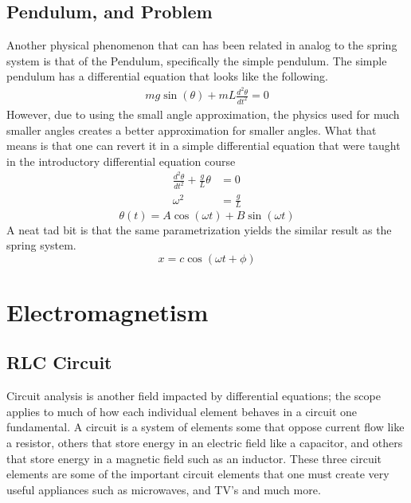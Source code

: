 \documentclass[11pt]{article} %
\begin{document}
\subsection{Pendulum, and Problem}
Another physical phenomenon that can has been related in analog to the spring system is that of the Pendulum, specifically the simple pendulum. The simple pendulum has a differential equation that looks like the following.
\begin{align*}mg\sin(\theta) + mL\frac{d^2\theta}{dt^2}= 0\end{align*} However, due to using the small angle approximation, the physics used for much smaller angles creates a better approximation for smaller angles. What that means is that one can revert it in a simple differential equation that were taught in the introductory differential equation course\begin{align*} \frac{d^2\theta}{dt^2}+\frac{g}{L}\theta&=0 \\ \omega^2 &= \frac{g}{L}\end{align*} \begin{equation} \theta(t)= A\cos(\omega t) + B\sin(\omega t)\end{equation} A neat tad bit is that the same parametrization yields the similar result as the spring system.\begin{equation}x=c\cos(\omega t +\phi) \end{equation}
\newpage
\section{Electromagnetism}
\subsection{RLC Circuit}
Circuit analysis is another field impacted by differential equations; the scope applies to much of how each individual element behaves in a circuit one fundamental. A circuit is a system of elements some that oppose current flow like a resistor, others that store energy in an electric field like a capacitor, and others that store energy in a magnetic field such as an inductor. These three circuit elements are some of the important circuit elements that one must create very useful appliances such as microwaves, and TV's and much more.
\newpage
\end{document}

